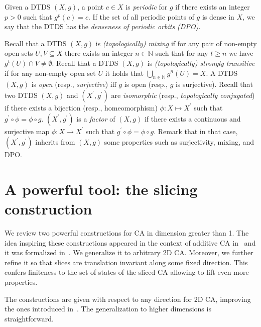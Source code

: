 \documentclass{llncs}
\newcommand{\n}{\ensuremath{\mathbb{N}}\xspace}
\newcommand{\para}[1]{(#1)}
\newcommand{\ignore}[1]{}
\begin{document}
Given a DTDS $\para{X,g}$, a point $c\in X$ is \emph{periodic} for
$g$ if there exists an integer $p>0$ such that $g^p(c)=c$. If the
set of all periodic points of $g$ is dense in $X$, we say that the
DTDS has the \emph{denseness of periodic orbits (DPO)}.
\ignore{
Recall that a DTDS $\para{X,g}$ is \emph{(topologically)
transitive} if for any pair of non-empty open sets
$O_1,O_2\subseteq X$ there exists an integer $n\in\n$ such that
$g^n(O_1)\cap O_2\ne\emptyset$.}
Recall that a DTDS $\para{X,g}$ is \emph{(topologically) mixing} if 
for any pair of non-empty open sets $U,V\subseteq X$ there 
exists an integer $n\in\n$ such that for any $t\geq n$ we have 
$g^t(U)\cap V\ne\emptyset$. Recall that a DTDS $\para{X,g}$ is \emph{(topologically) strongly transitive} if 
for any non-empty open set $U$ it holds that $\bigcup_{n\in\n} g^n(U)=X$.
A DTDS $\para{X,g}$ is \emph{open}
(resp., \emph{surjective}) iff  $g$ is open (resp., $g$ is
surjective).
Recall that two DTDS $\para{X,g}$ and $\para{X^\prime,g^{\prime}}$
are \emph{isomorphic} (resp., \emph{topologically conjugated}) if
there exists a bijection (resp., homeomorphism) $\phi:X\mapsto
X^\prime$ such that
$g^\prime\circ \phi=\phi\circ g$. $\para{X^\prime,g^{\prime}}$ is
a \emph{factor} of $\para{X,g}$ if  there exists a continuous and
surjective map $\phi:X\to X^\prime$ such that $g^\prime\circ
\phi=\phi\circ g$.
Remark that in that case, $\para{X^\prime,g^{\prime}}$ inherits
from $\para{X,g}$ some properties such as surjectivity,
mixing, and DPO.





\section{A powerful tool: the slicing construction}
\label{sec:slicing}

We review two powerful constructions for CA in
dimension greater than 1. The idea inspiring these constructions
appeared in the context of additive CA in~\cite{margara99} and it
was formalized in~\cite{CDM04}.  We
generalize it to arbitrary 2D CA. Moreover, we further refine it
so that slices are translation invariant along some fixed
direction. This confers finiteness to the set of states of the
sliced CA allowing to lift even more properties.
\smallskip

The constructions are given with respect to any direction for 2D
CA, improving the ones introduced in~\cite{dennunzio08}. The
generalization to higher dimensions is straightforward.
\smallskip
\end{document}
